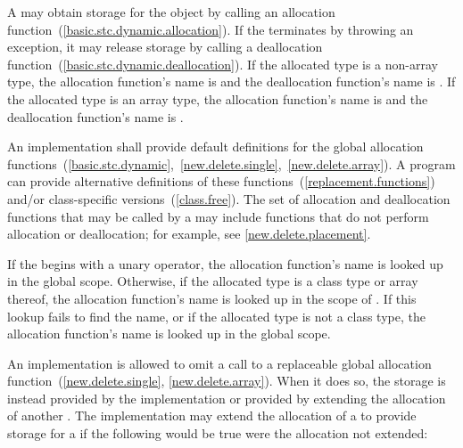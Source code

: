 \pnum
A  may obtain storage for the object by calling an
allocation function~(\ref{basic.stc.dynamic.allocation}). If
the  terminates by throwing an exception, it
may release storage by calling a deallocation
function~(\ref{basic.stc.dynamic.deallocation}). If the allocated type
is a non-array type, the allocation function's name is
%
%
 and the deallocation function's name is
. If the allocated type is an array type, the
allocation function's name is
%
%
and the deallocation function's name is
.
\begin{note}
An implementation shall provide default definitions for the global
allocation
functions~(\ref{basic.stc.dynamic},~\ref{new.delete.single},~\ref{new.delete.array}).
A \Cpp program can provide alternative definitions of
these functions~(\ref{replacement.functions}) and/or class-specific
versions~(\ref{class.free}).
The set of allocation and deallocation functions that may be called
by a 
may include functions that do not perform allocation or deallocation;
for example, see \ref{new.delete.placement}.
\end{note}

\pnum
{}%
If the  begins with a unary \tcode{::}
operator, the allocation function's name is looked up in the global
scope. Otherwise, if the allocated type is a class type  or
array thereof, the allocation function's name is looked up in the scope
of . If this lookup fails to find the name, or if the allocated
type is not a class type, the allocation function's name is looked up in
the global scope.

\pnum
An implementation is allowed to omit a call to a replaceable global allocation
function~(\ref{new.delete.single}, \ref{new.delete.array}). When it does so,
the storage is instead provided by the implementation or provided by extending
the allocation of another . The implementation may
extend the allocation of a   to provide
storage for a   if the
following would be true were the allocation not extended:

